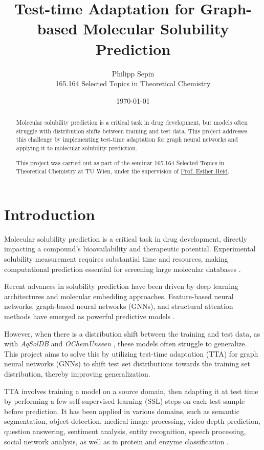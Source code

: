 \documentclass[11pt,a4paper]{article}
\title{Test-time Adaptation for Graph-based Molecular Solubility Prediction}
\author{Philipp Sepin\\
        165.164 Selected Topics in Theoretical Chemistry}
\date{\today}
\begin{document}
\maketitle

\begin{abstract}
        Molecular solubility prediction is a critical task in drug development, but models often struggle with distribution shifts between training and test data. This project addresses this challenge by implementing test-time adaptation for graph neural networks and applying it to molecular solubility prediction.

        This project was carried out as part of the seminar 165.164 Selected Topics in Theoretical Chemistry at TU Wien, under the supervision of \href{https://hesther.github.io/}{Prof. Esther Heid}.
\end{abstract}

\section{Introduction}
Molecular solubility prediction is a critical task in drug development, directly impacting a compound's bioavailability and therapeutic potential. Experimental solubility measurement requires substantial time and resources, making computational prediction essential for screening large molecular databases \cite{llompart2024will}.

Recent advances in solubility prediction have been driven by deep learning architectures and molecular embedding approaches. Feature-based neural networks, graph-based neural networks (GNNs), and structural attention methods have emerged as powerful predictive models \cite{llompart2024will}.

However, when there is a distribution shift between the training and test data, as with \textit{AqSolDB} \cite{sorkun2019aqsoldb} and \textit{OChemUnseen} \cite{llompart2024will}, these models often struggle to generalize. This project aims to solve this by utilizing test-time adaptation (TTA) for graph neural networks (GNNs) to shift test set distributions towards the training set distribution, thereby improving generalization.

TTA involves training a model on a source domain, then adapting it at test time by performing a few self-supervised learning (SSL) steps on each test sample before prediction. It has been applied in various domains, such as semantic segmentation, object detection, medical image processing, video depth prediction, question answering, sentiment analysis, entity recognition, speech processing, social network analysis, as well as in protein and enzyme classification \cite{liang2025comprehensive, cui2025online}.
\end{document}
